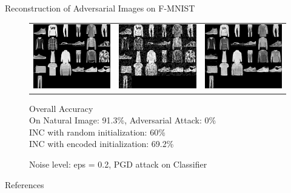 \documentclass[10pt]{beamer}
\begin{document}
\begin{frame}{Reconstruction of Adversarial Images on F-MNIST}
\begin{figure}[H]
\centering
\hspace*{-1cm}
\begin{tabular}{ccc}
\includegraphics[width=1.5in]{f_mnist_original.png} &
\includegraphics[width=1.5in]{f_mnist_adversarial.png} &
\includegraphics[width=1.5in]{f_mnist_reconstr_encoded.png} 
\end{tabular}
\caption{Noise level: eps = 0.2, PGD attack on Classifier}

Overall Accuracy \\
On Natural Image: 91.3\%, Adversarial Attack: 0\% \\
INC with random initialization: 60\% \\
INC with encoded initialization: 69.2\%
\end{figure}
\end{frame}
\appendix

\begin{frame}[allowframebreaks]{References}

  
  

\end{frame}
\end{document}
